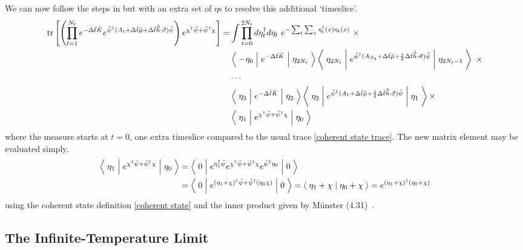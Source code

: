 We can now follow the steps in  but with an extra set of $\eta$s to resolve this additional `timeslice'.
\begin{align}
	\text{tr}\left[\left(\prod_{t=1}^{N_t} e^{-\Delta \tilde{t}\tilde{K}}  e^{ \tilde{\psi}{}^{\dagger} (A_t + \Delta\tilde{t} \tilde{\mu} + \Delta\tilde{t}\tilde{\vec{h}}\cdot\vec{\sigma}) \tilde{\psi} }\right) e^{\chi{}^{\dagger} \tilde{\psi} + \tilde{\psi}{}^{\dagger} \chi}\right]
	=& \int \prod_{t=0}^{2N_t} d \eta^{\dagger}_t d\eta_t ~ e^{- \sum_{t}\sum_x \eta^{\dagger}_t(x) \eta_t(x)}~ \times
	\nonumber\\
	&
		\left\langle\; -\eta_0 \;\middle|\; e^{-\Delta \tilde{t}\tilde{K} }\;\middle|\;\eta_{2 N_t}\;\right\rangle
		\left\langle\; \eta_{2 N_t} \;\middle|\; e^{ \tilde{\psi}{}^{\dagger} (A_{N_t} + \Delta\tilde{t}\tilde{\mu} + \frac{1}{2} \Delta\tilde{t}\tilde{\vec{h}}\cdot\vec{\sigma})\tilde{\psi} } \;\middle|\;\eta_{2 N_t-1}\;\right\rangle ~ \times
	\nonumber\\
	&
		\cdots
	\nonumber\\
	&
		\left\langle\; \eta_3 \;\middle|\; e^{-\Delta \tilde{t}\tilde{K} }\;\middle|\;\eta_{2}\;\right\rangle
		\left\langle\; \eta_2 \;\middle|\; e^{ \tilde{\psi}{}^{\dagger} (A_{1} + \Delta\tilde{t}\tilde{\mu} + \frac{1}{2} \Delta\tilde{t}\tilde{\vec{h}}\cdot\vec{\sigma}) \tilde{\psi}} \;\middle|\;\eta_1\;\right\rangle \times
	\nonumber\\
	&
		\left\langle\; \eta_1 \;\middle|\; e^{\chi{}^{\dagger} \tilde{\psi} + \tilde{\psi}{}^{\dagger} \chi} \;\middle|\; \eta_0 \;\right\rangle
\end{align}
where the measure starts at $t=0$, one extra timeslice compared to the usual trace \eqref{coherent state trace}.
The new matrix element may be evaluated simply,
\begin{align}
	\left\langle\; \eta_1 \;\middle|\; e^{\chi{}^{\dagger} \tilde{\psi} + \tilde{\psi}{}^{\dagger} \chi} \;\middle|\; \eta_0 \;\right\rangle
	&=
	\left\langle\; 0 \;\middle|\; e^{\eta{}^{\dagger}_1 \tilde{\psi}} e^{\chi{}^{\dagger} \tilde{\psi} + \tilde{\psi}{}^{\dagger} \chi} e^{\tilde{\psi}{}^{\dagger} \eta_0}\;\middle|\; 0 \;\right\rangle
	\nonumber\\
	&=
	\left\langle\; 0 \;\middle|\; e^{(\eta_1+\chi){}^{\dagger} \tilde{\psi} + \tilde{\psi}{}^{\dagger} (\eta_0 \chi)} \;\middle|\; 0 \;\right\rangle
	=
	\left\langle\;\eta_1 + \chi\;\middle|\;\eta_0 + \chi\;\right\rangle
	=
	e^{(\eta_1+\chi){}^{\dagger} (\eta_0+\chi)}
\end{align}
using the coherent state definition \eqref{coherent state} and the inner product given by M\"{u}nster (4.31)~\cite{munster}.

\subsection{The Infinite-Temperature Limit}\label{sec:infinite temperature}

